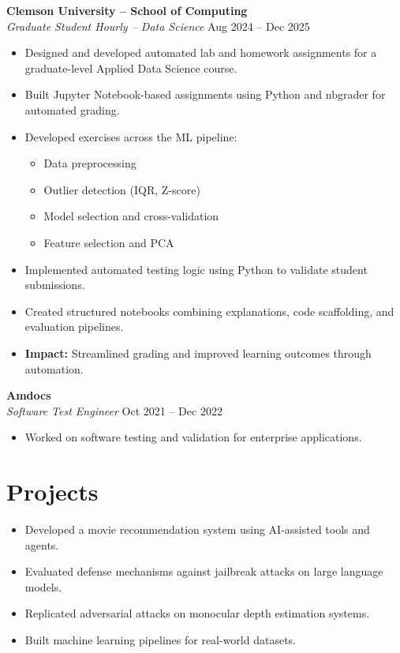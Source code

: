 \documentclass[10pt]{article}
\begin{document}
\textbf{Clemson University – School of Computing} \\
\textit{Graduate Student Hourly – Data Science} \hfill Aug 2024 -- Dec 2025
\begin{itemize}[noitemsep, topsep=0pt]
    \item Designed and developed automated lab and homework assignments for a graduate-level Applied Data Science course.
    \item Built Jupyter Notebook-based assignments using Python and nbgrader for automated grading.
    \item Developed exercises across the ML pipeline:
    \begin{itemize}[noitemsep]
        \item Data preprocessing
        \item Outlier detection (IQR, Z-score)
        \item Model selection and cross-validation
        \item Feature selection and PCA
    \end{itemize}
    \item Implemented automated testing logic using Python to validate student submissions.
    \item Created structured notebooks combining explanations, code scaffolding, and evaluation pipelines.
    \item \textbf{Impact:} Streamlined grading and improved learning outcomes through automation.
\end{itemize}

\vspace{0.2cm}

\textbf{Amdocs} \\
\textit{Software Test Engineer} \hfill Oct 2021 -- Dec 2022
\begin{itemize}[noitemsep, topsep=0pt]
    \item Worked on software testing and validation for enterprise applications.
\end{itemize}

\vspace{0.2cm}

\section*{Projects}
\begin{itemize}[noitemsep, topsep=0pt]
    \item Developed a movie recommendation system using AI-assisted tools and agents.
    \item Evaluated defense mechanisms against jailbreak attacks on large language models.
    \item Replicated adversarial attacks on monocular depth estimation systems.
    \item Built machine learning pipelines for real-world datasets.
\end{itemize}
\end{document}
